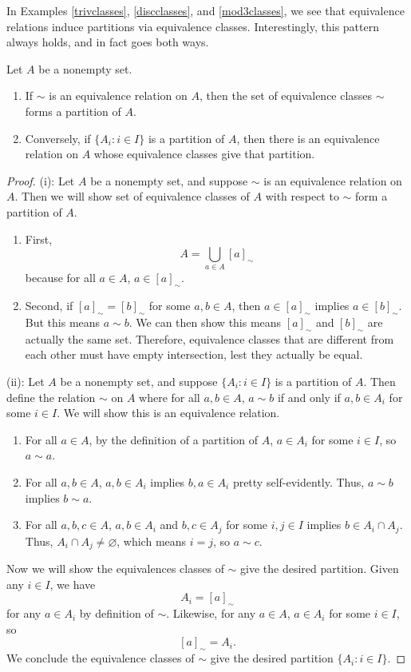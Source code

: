 \documentclass{amsart}
\begin{document}
In Examples \ref{trivclasses}, \ref{discclasses}, and \ref{mod3classes}, we see
that equivalence relations induce partitions via equivalence classes.
Interestingly, this pattern always holds, and in fact goes both ways.
\begin{theorem}[{\cite[p.~3]{df}}]
   Let \(A\) be a nonempty set. 
	\begin{enumerate}[label=(\roman*)]
	  \item If \(\sim\) is an equivalence relation on \(A\), then the set of
	  equivalence classes \(\sim\) forms a partition of \(A\). 
	  \item Conversely, if \(\{A_i: i\in I\}\) is a partition of \(A\), then
		there is an equivalence relation on \(A\) whose equivalence classes give
		that partition.
	\end{enumerate}
\end{theorem}
\begin{proof}
	(i): Let \(A\) be a nonempty set, and suppose \(\sim\) is an equivalence
	relation on \(A\). Then we will show set of equivalence classes of \(A\) with
	respect to \(\sim\) form a partition of \(A\). 
	\begin{enumerate}[label=(\alph*)]
		\item First, 
		\[
			A = \bigcup_{a\in A}[a]_\sim
		\]
		because for all \(a\in A\), \(a\in [a]_\sim\).
		\item Second, if \([a]_\sim = [b]_\sim\) for some \(a, b\in A\), then
		\(a\in [a]_\sim\) implies \(a\in [b]_\sim\). But this means \(a\sim b\).
		We can then show this means \([a]_\sim\) and \([b]_\sim\) are actually
		the same set. Therefore, equivalence classes that are different from each
		other must have empty intersection, lest they actually be equal.
	\end{enumerate}

	(ii): Let \(A\) be a nonempty set, and suppose \(\{A_i: i\in I\}\) is a
	partition of \(A\). Then define the relation \(\sim\) on \(A\) where for all
	\(a, b\in A\), \(a\sim
	b\) if and only if \(a, b\in A_i\) for some \(i\in I\). We will show this is
	an equivalence relation. 
	\begin{enumerate}[label=(\alph*)]
		\item For all \(a\in A\), by the definition of a partition of \(A\),
		\(a\in A_i\) for some \(i\in I\), so \(a\sim a\).
		\item For all \(a, b\in A\), \(a, b\in A_i\) implies \(b, a\in A_i\)
		pretty self-evidently. Thus, \(a\sim b\) implies \(b\sim a\).
		\item For all \(a, b, c\in A\), \(a, b\in A_i\) and \(b, c\in A_j\) for
		some \(i, j\in I\) implies \(b\in A_i\cap A_j\). Thus, \(A_i\cap
		A_j\ne\varnothing\), which means \(i = j\), so \(a\sim c\).
	\end{enumerate}
	Now we will show the equivalences classes of \(\sim\) give the desired
	partition. Given any \(i\in I\), we have 
	\[
		A_i = [a]_\sim
	\] 
	for any \(a\in A_i\) by definition of \(\sim\). Likewise, for any \(a\in
	A\), \(a\in A_i\) for some \(i\in I\), so 
	\[
		[a]_\sim = A_i.
	\]
	We conclude the equivalence classes of \(\sim\) give the desired
	partition \(\{A_i : i\in I\}\).
\end{proof}
\end{document}
